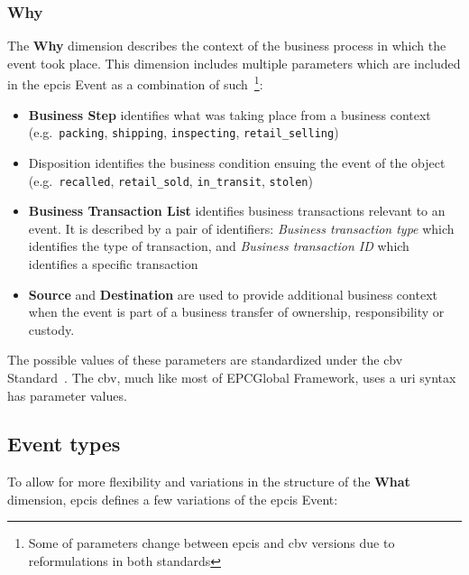 \subsubsection{Why}

The \textbf{Why} dimension describes the context of the business process in which the event took place.
This dimension includes multiple parameters which are included in the \ac{epcis} Event as a combination of such~\footnote{Some of parameters change between \ac{epcis} and \ac{cbv} versions due to reformulations in both standards}:

\begin{itemize}
    \item \textbf{Business Step} identifies what was taking place from a business context (e.g.\ \texttt{packing}, \texttt{shipping}, \texttt{inspecting}, \texttt{retail_selling})
    \item \textbf{}{Disposition} identifies the business condition ensuing the event of the object (e.g.\ \texttt{recalled}, \texttt{retail_sold}, \texttt{in_transit}, \texttt{stolen})
    \item \textbf{Business Transaction List} identifies business transactions relevant to an event. It is described by a pair of identifiers: \emph{Business transaction type} which identifies the type of transaction, and \emph{Business transaction ID} which identifies a specific transaction
    \item \textbf{Source} and \textbf{Destination} are used to provide additional business context when the event is part of a business transfer of ownership, responsibility or custody.
\end{itemize}

The possible values of these parameters are standardized under the \ac{cbv} Standard~\cite{CoreBusinessVocabulary}. The \ac{cbv}, much like most of EPCGlobal Framework, uses a \ac{uri} syntax has parameter values.

\subsection{Event types}

To allow for more flexibility and variations in the structure of the \textbf{What} dimension, \ac{epcis} defines a few variations of the \ac{epcis} Event:

